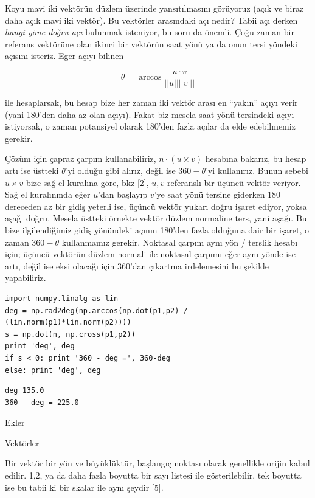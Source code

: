 \documentclass[12pt,fleqn]{article}\usepackage{../../common}
\begin{document}
Koyu mavi iki vektörün düzlem üzerinde yansıtılmasını görüyoruz (açık ve
biraz daha açık mavi iki vektör). Bu vektörler arasındaki açı nedir? Tabii
açı derken {\em hangi yöne doğru açı} bulunmak isteniyor, bu soru da
önemli. Çoğu zaman bir referans vektörüne olan ikinci bir vektörün saat
yönü ya da onun tersi yöndeki açısını isteriz. Eger açıyı bilinen

$$ \theta = \arccos \frac{u \cdot v}{||u||||v|||}$$

ile hesaplarsak, bu hesap bize her zaman iki vektör arası en ``yakın''
açıyı verir (yani 180'den daha az olan açıyı). Fakat biz mesela saat yönü
tersindeki açıyı istiyorsak, o zaman potansiyel olarak 180'den fazla açılar
da elde edebilmemiz gerekir.

Çözüm için çapraz çarpım kullanabiliriz, $n \cdot (u \times v)$ hesabına
bakarız, bu hesap artı ise üstteki $\theta$'yi olduğu gibi alırız, değil
ise $360-\theta$'yi kullanırız. Bunun sebebi $u \times v$ bize sağ el
kuralına göre, bkz [2], $u,v$ referanslı bir üçüncü vektör veriyor. Sağ el
kuralınında eğer $u$'dan başlayıp $v$'ye saat yönü tersine giderken 180
dereceden az bir gidiş yeterli ise, üçüncü vektör yukarı doğru işaret
ediyor, yoksa aşağı doğru. Mesela üstteki örnekte vektör düzlem normaline
ters, yani aşağı. Bu bize ilgilendiğimiz gidiş yönündeki açının 180'den
fazla olduğuna dair bir işaret, o zaman $360 - \theta$ kullanmamız
gerekir. Noktasal çarpım aynı yön / terslik hesabı için; üçüncü vektörün
düzlem normali ile noktasal çarpımı eğer aynı yönde ise artı, değil ise
eksi olacağı için 360'dan çıkartma irdelemesini bu şekilde yapabiliriz.

\begin{verbatim}
import numpy.linalg as lin
deg = np.rad2deg(np.arccos(np.dot(p1,p2) / (lin.norm(p1)*lin.norm(p2))))
s = np.dot(n, np.cross(p1,p2))
print 'deg', deg
if s < 0: print '360 - deg =', 360-deg
else: print 'deg', deg
\end{verbatim}

\begin{verbatim}
deg 135.0
360 - deg = 225.0
\end{verbatim}

Ekler

Vektörler

Bir vektör bir yön ve büyüklüktür, başlangıç noktası olarak genellikle orijin
kabul edilir. 1,2, ya da daha fazla boyutta bir sayı listesi ile gösterilebilir,
tek boyutta ise bu tabii ki bir skalar ile aynı şeydir [5]. 
\end{document}
